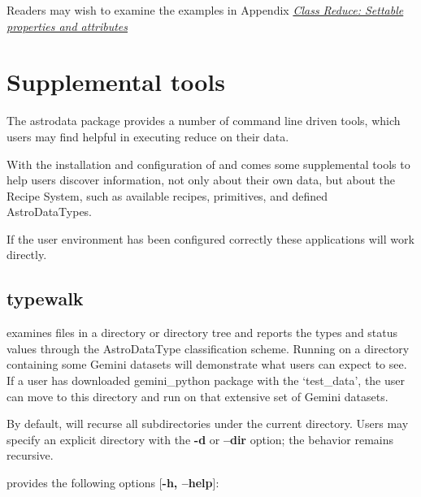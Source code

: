 \documentclass[letterpaper,10pt,english]{sphinxmanual}
\begin{document}
Readers may wish to examine the examples in Appendix
{\hyperref[appendices/reduce_properties:props]{\emph{Class Reduce: Settable properties and attributes}}}


\chapter{Supplemental tools}
\label{supptools:supplemental-tools}\label{supptools::doc}
The astrodata package provides a number of command line driven tools, which
users may find helpful in executing reduce on their data.

With the installation and configuration of  and  comes
some supplemental tools to help users discover information, not only about their
own data, but about the Recipe System, such as available recipes, primitives,
and defined AstroDataTypes.

If the user environment has been configured correctly these applications
will work directly.


\section{typewalk}
\label{supptools:typewalk}\label{supptools:id1}
 examines files in a directory or directory tree and reports the types
and status values through the AstroDataType classification scheme. Running 
on a directory containing some Gemini datasets will demonstrate what users can expect
to see. If a user has downloaded gemini\_python package with the `test\_data', the
user can move to this directory and run  on that extensive set of
Gemini datasets.

By default,  will recurse all subdirectories under the current
directory. Users may specify an explicit directory with the \textbf{-d} or
\textbf{--dir} option; the behavior remains recursive.

 provides the following options {[}\textbf{-h, --help}{]}:
\end{document}
